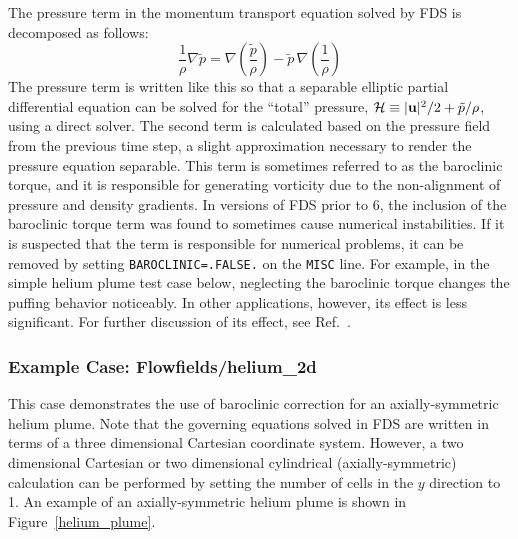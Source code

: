 \documentclass[11pt]{book}
\newcommand{\ct}{\tt\small}
\newcommand{\bu}{{\bf u}}
\newcommand{\tp}{\tilde{p}}
\newcommand{\be}{\begin{equation}}
\newcommand{\ee}{\end{equation}}
\begin{document}
The pressure term in the momentum transport equation solved by FDS is decomposed as follows:
\be \frac{1}{\rho} \nabla \tp = \nabla \left( \frac{\tp}{\rho}\right) - \tp \, \nabla \left(\frac{1}{\rho} \right)  \ee
The pressure term is written like this so that a separable elliptic partial differential equation can be solved for the
``total'' pressure, ${\cal H} \equiv |\bu|^2/2 + \tp/\rho$, using a direct solver. The second term is calculated based on
the pressure field from the previous time step, a slight approximation necessary to render the pressure equation separable.
This term is sometimes referred to as the baroclinic torque, and it is responsible for
generating vorticity due to the non-alignment of pressure and density gradients.
In versions of FDS prior to 6, the inclusion of the baroclinic torque term was found to sometimes cause numerical
instabilities. If it is suspected that the term is responsible for numerical problems, it can be removed by setting {\ct BAROCLINIC=.FALSE.} on the {\ct MISC} line.
For example, in the simple helium plume test case below,
neglecting the baroclinic torque changes the puffing behavior noticeably. In other applications, however, its effect is less significant.
For further discussion of its effect, see Ref.~\cite{Xin:JSS2005}.




\subsubsection{Example Case: Flowfields/helium\_2d}

This case demonstrates the use of baroclinic correction for an axially-symmetric helium plume.
Note that the governing equations solved in FDS are written in terms of a
three dimensional Cartesian coordinate system. However,
a two dimensional Cartesian or two dimensional cylindrical
(axially-symmetric) calculation can be performed by setting the number of
cells in the $y$ direction to 1.
An example of an axially-symmetric helium plume is shown in Figure~\ref{helium_plume}.
\end{document}
